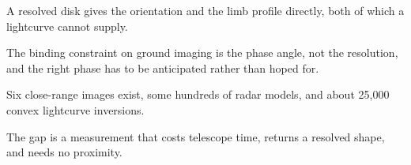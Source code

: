 \begin{keytakeaways}
\item A resolved disk gives the orientation and the limb profile directly,
both of which a lightcurve cannot supply.
\item The binding constraint on ground imaging is the phase angle, not the
resolution, and the right phase has to be anticipated rather than hoped for.
\item Six close-range images exist, some hundreds of radar models, and about
25,000 convex lightcurve inversions.
\item The gap is a measurement that costs telescope time, returns a resolved
shape, and needs no proximity.
\end{keytakeaways}
